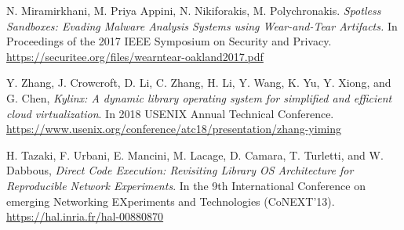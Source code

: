 \documentclass[a4paper,11pt]{article}
\begin{document}
\begin{compactitem}
\item N. Miramirkhani, M. Priya Appini, N. Nikiforakis,
  M. Polychronakis. \textit{Spotless Sandboxes: Evading Malware
    Analysis Systems using Wear-and-Tear Artifacts.}  In Proceedings
  of the 2017 IEEE Symposium on Security and Privacy.
  \url{https://securitee.org/files/wearntear-oakland2017.pdf}
\item Y. Zhang, J. Crowcroft, D. Li, C. Zhang, H. Li, Y. Wang, K. Yu,
  Y. Xiong, and G. Chen, \textit{Kylinx: A dynamic library operating
    system for simplified and efficient cloud virtualization}. In 2018
  USENIX Annual Technical Conference.
  \url{https://www.usenix.org/conference/atc18/presentation/zhang-yiming} 
\item H. Tazaki, F. Urbani, E. Mancini, M. Lacage, D. Camara,
  T. Turletti, and W. Dabbous, \textit{Direct Code Execution:
    Revisiting Library OS Architecture for Reproducible Network
    Experiments}. In the 9th International Conference on emerging
  Networking EXperiments and Technologies
  (CoNEXT'13). \url{https://hal.inria.fr/hal-00880870}
\end{compactitem}
\end{document}
